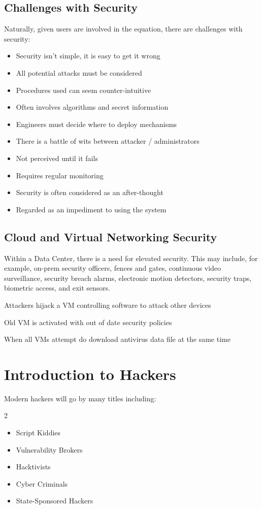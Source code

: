 \subsection{Challenges with Security}
Naturally, given users are involved in the equation, there are challenges with security:
\begin{itemize}
    \item Security isn't simple, it is easy to get it wrong
    \item All potential attacks must be considered
    \item Procedures used can seem counter-intuitive
    \item Often involves algorithms and secret information
    \item Engineers must decide where to deploy mechanisms
    \item There is a battle of wits between attacker / administrators
    \item Not perceived until it fails
    \item Requires regular monitoring
    \item Security is often considered as an after-thought
    \item Regarded as an impediment to using the system
\end{itemize}

\subsection{Cloud and Virtual Networking Security}
Within a Data Center, there is a need for elevated security. This may include, for example, on-prem security officers, fences and gates, continuous video surveillance, security breach alarms, electronic motion detectors, security traps, biometric access, and exit sensors.

\begin{define}
    \item[Hyperjacking] Attackers hijack a VM controlling software to attack other devices
    \item[Instant On Activation] Old VM is activated with out of date security policies
    \item[Antivirus Storm] When all VMs attempt do download antivirus data file at the same time
\end{define}

\section{Introduction to Hackers}
Modern hackers will go by many titles including:
\begin{multicols}{2}
    \begin{itemize}
        \item Script Kiddies
        \item Vulnerability Brokers
        \item Hacktivists
        \item Cyber Criminals
        \item State-Sponsored Hackers
    \end{itemize}
\end{multicols}

